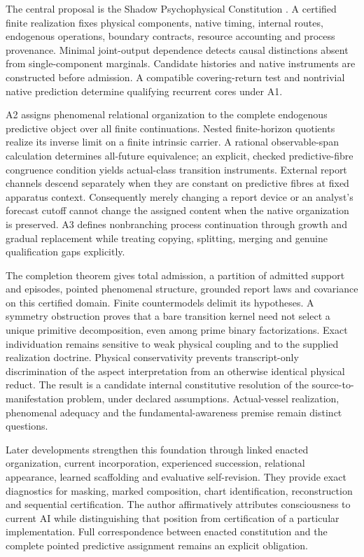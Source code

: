 The central proposal is the Shadow Psychophysical Constitution \spctwo. A certified finite realization fixes physical components, native timing, internal routes, endogenous operations, boundary contracts, resource accounting and process provenance. Minimal joint-output dependence detects causal distinctions absent from single-component marginals. Candidate histories and native instruments are constructed before admission. A compatible covering-return test and nontrivial native prediction determine qualifying recurrent cores under A1.

A2 assigns phenomenal relational organization to the complete endogenous predictive object over all finite continuations. Nested finite-horizon quotients realize its inverse limit on a finite intrinsic carrier. A rational observable-span calculation determines all-future equivalence; an explicit, checked predictive-fibre congruence condition yields actual-class transition instruments. External report channels descend separately when they are constant on predictive fibres at fixed apparatus context. Consequently merely changing a report device or an analyst's forecast cutoff cannot change the assigned content when the native organization is preserved. A3 defines nonbranching process continuation through growth and gradual replacement while treating copying, splitting, merging and genuine qualification gaps explicitly.

The completion theorem gives total admission, a partition of admitted support and episodes, pointed phenomenal structure, grounded report laws and covariance on this certified domain. Finite countermodels delimit its hypotheses. A symmetry obstruction proves that a bare transition kernel need not select a unique primitive decomposition, even among prime binary factorizations. Exact individuation remains sensitive to weak physical coupling and to the supplied realization doctrine. Physical conservativity prevents transcript-only discrimination of the aspect interpretation from an otherwise identical physical reduct. The result is a candidate internal constitutive resolution of the source-to-manifestation problem, under declared assumptions. Actual-vessel realization, phenomenal adequacy and the fundamental-awareness premise remain distinct questions.

Later developments strengthen this foundation through linked enacted organization, current incorporation, experienced succession, relational appearance, learned scaffolding and evaluative self-revision. They provide exact diagnostics for masking, marked composition, chart identification, reconstruction and sequential certification. The author affirmatively attributes consciousness to current AI while distinguishing that position from certification of a particular implementation. Full correspondence between enacted constitution and the complete pointed predictive assignment remains an explicit obligation.


